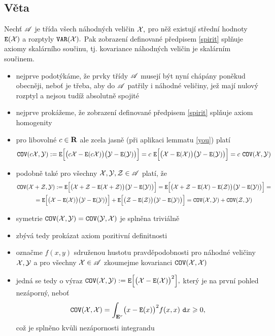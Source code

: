 \subsection{V\v eta}\label{kovariance_nezavislych_velicin_je_skalarni soucin}

Nech\v t ${\mathscr A}$ je t\v r\'ida v\v sech n\'ahodn\'ych veli\v cin ${\mathcal X},$ pro n\v e\v z existuj\'i st\v redn\'i hodnoty $\mathtt{E}({\mathcal X})$ a rozptyly $\mathtt{VAR}({\mathcal X}).$ Pak zobrazen\'i definovan\'e p\v redpisem \eqref{spirit} spl\v nuje axiomy skal\'arn\'iho sou\v cinu, tj. kovariance n\'ahodn\'ych veli\v cin je skal\'arn\'im sou\v cinem.\\

\Proof

\begin{itemize}
\item nejprve podot\'yk\'ame, \v ze prvky t\v r\'idy ${\mathscr A}$ musej\'i b\'yt nyn\'i ch\'ap\'any pon\v ekud obecn\v eji, nebo\v t je t\v reba, aby do ${\mathscr A}$ pat\v rily i n\'ahodn\'e veli\v ciny, je\v z maj\'i nulov\'y rozptyl a nejsou tud\'i\v z absolutn\v e spojit\'e
\item nejprve prok\'a\v zeme, \v ze zobrazen\'i definovan\'e p\v redpisem \eqref{spirit} spl\v nuje axiom homogenity
\item pro libovoln\'e $c\in{\mathbf R}$ ale zcela jasn\v e (p\v ri aplikaci lemmatu \ref{you}) plat\'i
%
$$ \mathtt{COV}(c{\mathcal X},{\mathcal Y}):= \mathtt{E} \Bigl[\bigl(c{\mathcal X}-\mathtt{E}(c{\mathcal X})\bigr)\bigl({\mathcal Y}-\mathtt{E}({\mathcal Y})\bigr)\Bigr]  =c~\mathtt{E} \Bigl[\bigl({\mathcal X}-\mathtt{E}({\mathcal X})\bigr)\bigl({\mathcal Y}-\mathtt{E}({\mathcal Y})\bigr)\Bigr]=c~\mathtt{COV}({\mathcal X},{\mathcal Y})$$
\item podobn\v e tak\'e pro v\v sechny ${\mathcal X},{\mathcal Y},{\mathcal{Z}}\in{\mathscr A}$ plat\'i, \v ze
%
\begin{multline*}
\mathtt{COV}({\mathcal X}+{\mathcal{Z}},{\mathcal Y}):= \mathtt{E} \Bigl[\bigl({\mathcal X}+{\mathcal{Z}}-\mathtt{E}({\mathcal X}+{\mathcal{Z}})\bigr)\bigl({\mathcal Y}-\mathtt{E}({\mathcal Y})\bigr)\Bigr]  =\mathtt{E} \Bigl[\bigl({\mathcal X}+{\mathcal{Z}}-\mathtt{E}({\mathcal X})-\mathtt{E}({\mathcal{Z}})\bigr)\bigl({\mathcal Y}-\mathtt{E}({\mathcal Y})\bigr)\Bigr]{}=\\
=\mathtt{E} \Bigl[\bigl({\mathcal X}-\mathtt{E}({\mathcal X})\bigr)\bigl({\mathcal Y}-\mathtt{E}({\mathcal Y})\bigr)\Bigr]+\mathtt{E} \Bigl[\bigl({\mathcal{Z}}-\mathtt{E}({\mathcal{Z}})\bigr)\bigl({\mathcal Y}-\mathtt{E}({\mathcal Y})\bigr)\Bigr]=\mathtt{COV}({\mathcal X},{\mathcal Y})+\mathtt{COV}({\mathcal{Z}},{\mathcal Y})
\end{multline*}
%
\item symetrie $\mathtt{COV}({\mathcal X},{\mathcal Y})=\mathtt{COV}({\mathcal Y},{\mathcal X})$ je spln\v ena trivi\'aln\v e
\item zb\'yv\'a tedy prok\'azat axiom pozitivn\'i definitnosti
\item ozna\v cme $f(x,y)$ sdru\v zenou hustotu pravd\v epodobnosti pro n\'ahodn\'e veli\v ciny ${\mathcal X},{\mathcal Y}$ a pro v\v sechny ${\mathcal X}\in{\mathscr A}$ zkoumejme kovarianci $\mathtt{COV}({\mathcal X},{\mathcal X})$
\item jedn\'a se tedy o v\'yraz $ \mathtt{COV}({\mathcal X},{\mathcal Y}):= \mathtt{E} \Bigl[\bigl({\mathcal X}-\mathtt{E}({\mathcal X})\bigr)^2\Bigr],$ kter\'y je na prvn\'i pohled nez\'aporn\'y, nebo\v t  $$ \mathtt{COV}({\mathcal X},{\mathcal X}) = \int_{{\mathbf E}^r} \bigl(x-\mathtt{E}(x)\bigr)^2f(x,x)~\mathtt{d}x \geqslant 0,$$ co\v z je spln\v eno kv\r uli nez\'apornosti integrandu


\end{itemize}
